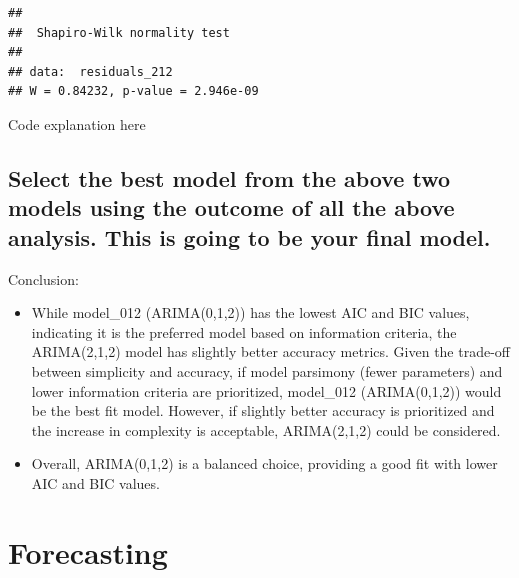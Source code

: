 \documentclass[
]{book}
\begin{document}
\begin{verbatim}
## 
##  Shapiro-Wilk normality test
## 
## data:  residuals_212
## W = 0.84232, p-value = 2.946e-09
\end{verbatim}

Code explanation here

\section{Select the best model from the above two models using the outcome of all the above analysis. This is going to be your final model.}\label{select-the-best-model-from-the-above-two-models-using-the-outcome-of-all-the-above-analysis.-this-is-going-to-be-your-final-model.}

Conclusion:

\begin{itemize}
\item
  While model\_012 (ARIMA(0,1,2)) has the lowest AIC and BIC values, indicating it is the preferred model based on information criteria, the ARIMA(2,1,2) model has slightly better accuracy metrics. Given the trade-off between simplicity and accuracy, if model parsimony (fewer parameters) and lower information criteria are prioritized, model\_012 (ARIMA(0,1,2)) would be the best fit model. However, if slightly better accuracy is prioritized and the increase in complexity is acceptable, ARIMA(2,1,2) could be considered.
\item
  Overall, ARIMA(0,1,2) is a balanced choice, providing a good fit with lower AIC and BIC values.
\end{itemize}

\chapter{Forecasting}\label{forecasting}
\end{document}
